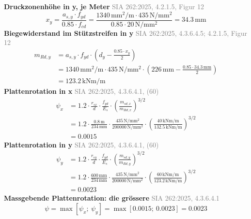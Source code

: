 \documentclass[11pt,a4paper]{article}
\newcommand{\normref}[1]{{\small\textcolor{gray}{#1}}}
\begin{document}
\noindent\textbf{Druckzonenhöhe in y, je Meter} \hfill \normref{SIA 262:2025, 4.2.1.5, Figur 12}
\begin{equation*}
x_y = \frac{a_{s,y} \cdot f_{yd}}{0.85 \cdot f_{cd}} = \frac{1340\,\mathrm{mm}^{2}/\mathrm{m} \cdot 435\,\mathrm{N}/\mathrm{mm}^{2}}{0.85 \cdot 20\,\mathrm{N}/\mathrm{mm}^{2}} = 34.3\,\mathrm{mm}
\end{equation*}
\noindent\textbf{Biegewiderstand im Stützstreifen in y} \hfill \normref{SIA 262:2025, 4.3.6.4.5; 4.2.1.5, Figur 12}
\begin{equation*}
\begin{aligned}
  m_{Rd,y} &= a_{s,y} \cdot f_{yd} \cdot \left(d_y - \frac{0.85 \cdot x_y}{2}\right) \\
  &= 1340\,\mathrm{mm}^{2}/\mathrm{m} \cdot 435\,\mathrm{N}/\mathrm{mm}^{2} \cdot \left(226\,\mathrm{mm} - \frac{0.85 \cdot 34.3\,\mathrm{mm}}{2}\right) \\
  &= 123.2\,\mathrm{kNm}/\mathrm{m}
\end{aligned}
\end{equation*}
\noindent\textbf{Plattenrotation in x} \hfill \normref{SIA 262:2025, 4.3.6.4.1, (60)}
\begin{equation*}
\begin{aligned}
  \psi_x &= 1.2 \cdot \frac{r_{sx}}{d} \cdot \frac{f_{yd}}{E_s} \cdot \left(\frac{m_{sd,x}}{m_{Rd,x}}\right)^{3/2} \\
  &= 1.2 \cdot \frac{0.8\,\mathrm{m}}{234\,\mathrm{mm}} \cdot \frac{435\,\mathrm{N}/\mathrm{mm}^{2}}{200000\,\mathrm{N}/\mathrm{mm}^{2}} \cdot \left(\frac{40\,\mathrm{kNm}/\mathrm{m}}{132.5\,\mathrm{kNm}/\mathrm{m}}\right)^{3/2} \\
  &= 0.0015
\end{aligned}
\end{equation*}
\noindent\textbf{Plattenrotation in y} \hfill \normref{SIA 262:2025, 4.3.6.4.1, (60)}
\begin{equation*}
\begin{aligned}
  \psi_y &= 1.2 \cdot \frac{r_{sy}}{d} \cdot \frac{f_{yd}}{E_s} \cdot \left(\frac{m_{sd,y}}{m_{Rd,y}}\right)^{3/2} \\
  &= 1.2 \cdot \frac{600\,\mathrm{mm}}{234\,\mathrm{mm}} \cdot \frac{435\,\mathrm{N}/\mathrm{mm}^{2}}{200000\,\mathrm{N}/\mathrm{mm}^{2}} \cdot \left(\frac{60\,\mathrm{kNm}/\mathrm{m}}{123.2\,\mathrm{kNm}/\mathrm{m}}\right)^{3/2} \\
  &= 0.0023
\end{aligned}
\end{equation*}
\noindent\textbf{Massgebende Plattenrotation: die grössere} \hfill \normref{SIA 262:2025, 4.3.6.4.1}
\begin{equation*}
\psi = \max\left[\psi_x;\ \psi_y\right] = \max\left[0.0015;\ 0.0023\right] = 0.0023
\end{equation*}
\end{document}
